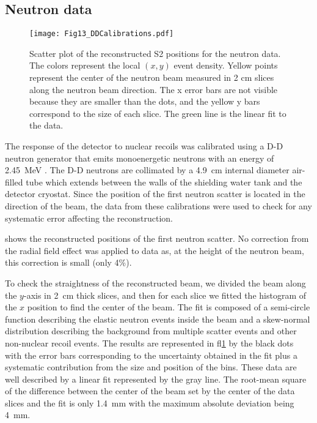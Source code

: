 \documentclass[a4paper,11pt]{article}
\begin{document}
\subsection{Neutron data}

\begin{figure}
\begin{center}
\texttt{[image: Fig13\_DDCalibrations.pdf]}	
\caption{Scatter plot of the reconstructed S2 positions for the neutron data. The colors represent the local $(x,y)$ event density. Yellow points represent the center of the neutron beam measured in 2 cm slices along the neutron beam direction. The x error bars are not visible because they are smaller than the dots, and the yellow y bars correspond to the size of each slice. The green line is the linear fit to the data.}
\label{Fig22_DDCalibrations}
\end{center}
\end{figure}


The response of the detector to nuclear recoils was calibrated  using a D-D neutron generator that emits monoenergetic neutrons with an energy of 2.45~MeV \cite{LUX2016_DDCalibrations, Verbus2017, VerbusPhDThesis2016}. The D-D neutrons are collimated by a 4.9~cm internal diameter air-filled tube which extends between the walls of the shielding water tank and the detector cryostat. Since the position of the first neutron scatter is located in the direction of the beam, the data from these calibrations were used to check for any systematic error affecting the reconstruction.

 shows the reconstructed positions of the first neutron scatter.  No correction from the radial field effect was applied to data as, at the height of the neutron beam, this correction is small (only 4\%).

To check the straightness of the reconstructed beam, we divided the beam along the $y$-axis in 2~cm thick slices, and then for each slice we fitted the histogram of the $x$ position to find the center of the beam. The fit is composed of a semi-circle function describing the elastic neutron events inside the beam and a skew-normal distribution describing the background from multiple scatter events and other non-nuclear recoil events. The results are represented in ﬂ\cref{Fig22_DDCalibrations} by the black dots with the error bars corresponding to the uncertainty obtained in the fit plus a systematic contribution from the size and position of the bins. These data are well described by a linear fit represented by the gray line. The root-mean square of the difference between the center of the beam set by the center of the data slices and the fit is only 1.4~mm with the maximum absolute deviation being 4~mm.
\end{document}
